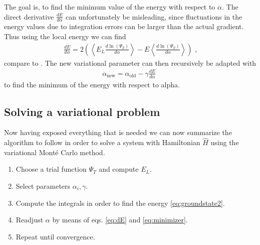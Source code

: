 The goal is, to find the minimum value of the energy with respect to $\alpha$. The direct derivative $\frac{dE}{d\alpha}$ can unfortunately be misleading, since fluctuations in the energy values due to integration errors can be larger than the actual gradient. Thus using the local energy
we can find
\begin{align}
\label{eq:dE}
\frac{dE}{d\alpha} = 2 \left( \left< E_L \frac{d \ln(\Psi_T)}{d \alpha} \right> - E\left<\frac{d \ln(\Psi_T)}{d \alpha}\right> \right) \text{~,}
\end{align}
compare to \cite{JosBook}.
The new variational parameter can then recursively be adapted with
\begin{align}
	\label{eq:minimizer}
	\alpha_{\text{new}} = \alpha_{\text{old}} - \gamma \frac{dE}{d\alpha} \text{~}
\end{align}
to find the minimum of the energy with respect to alpha.


\subsection{Solving a variational problem}
Now having exposed everything that is needed we
can now summarize the algorithm to follow in order to solve a system with Hamiltonian $\hat{H}$
using the variational Mont\'e Carlo method.
\begin{enumerate}
  \item Choose a trial function $\Psi_T$ and compute $E_L$.
  \item Select parameters $\alpha_i, \gamma$.
  \item Compute the integrals in order to find the energy \ref{eq:groundstate2}.
  \item Readjust $\alpha$ by means of eqs. \ref{eq:dE} and \ref{eq:minimizer}.
  \item Repeat until convergence.
\end{enumerate}




